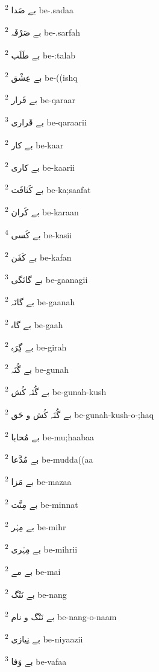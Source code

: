 \documentclass[12pt]{article}
\begin{document}
\begin{multicols}{5}
{\ur بے صَدا}   \textsuperscript{2} be-.sadaa

{\ur بے صَرْفَہ}   \textsuperscript{2} be-.sarfah

{\ur بے طَلَب}   \textsuperscript{2} be-:talab

{\ur بے عِشْق}   \textsuperscript{2} be-((ishq

{\ur بے قَرار}   \textsuperscript{2} be-qaraar

{\ur بے قَراری}   \textsuperscript{3} be-qaraarii

{\ur بے کار}   \textsuperscript{2} be-kaar

{\ur بے کاری}   \textsuperscript{2} be-kaarii

{\ur بے کَثافَت}   \textsuperscript{2} be-ka;saafat

{\ur بے کَران}   \textsuperscript{2} be-karaan

{\ur بے کَسی}   \textsuperscript{4} be-kasii

{\ur بے کَفَن}   \textsuperscript{2} be-kafan

{\ur بے گانَگی}   \textsuperscript{3} be-gaanagii

{\ur بے گانَہ}   \textsuperscript{2} be-gaanah

{\ur بے گاہ}   \textsuperscript{2} be-gaah

{\ur بے گِرَہ}   \textsuperscript{2} be-girah

{\ur بے گُنَہ}   \textsuperscript{2} be-gunah

{\ur بے گُنَہ کُش}   \textsuperscript{2} be-gunah-kush

{\ur بے گُنَہ کُش و حَق}   \textsuperscript{2} be-gunah-kush-o-;haq

{\ur بے مُحابا}   \textsuperscript{2} be-mu;haabaa

{\ur بے مُدَّعا}   \textsuperscript{2} be-mudda((aa

{\ur بے مَزا}   \textsuperscript{2} be-mazaa

{\ur بے مِنَّت}   \textsuperscript{2} be-minnat

{\ur بے مِہْر}   \textsuperscript{2} be-mihr

{\ur بے مِہْری}   \textsuperscript{2} be-mihrii

{\ur بے مے}   \textsuperscript{2} be-mai

{\ur بے نَنْگ}   \textsuperscript{2} be-nang

{\ur بے نَنْگ و نام}   \textsuperscript{2} be-nang-o-naam

{\ur بے نِیازی}   \textsuperscript{2} be-niyaazii

{\ur بے وَفا}   \textsuperscript{3} be-vafaa


\end{multicols}
\end{document}
